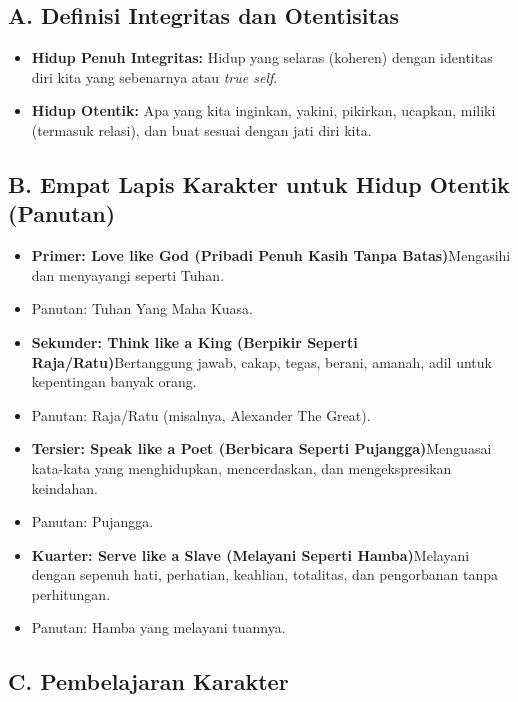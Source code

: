 \documentclass[
  letterpaper,
  DIV=11,
  numbers=noendperiod]{scrreprt}
\providecommand{\tightlist}{%
  \setlength{\itemsep}{0pt}\setlength{\parskip}{0pt}}
\begin{document}
\subsection{A. Definisi Integritas dan
Otentisitas}\label{a.-definisi-integritas-dan-otentisitas}

\begin{itemize}
\tightlist
\item
  \textbf{Hidup Penuh Integritas:} Hidup yang selaras (koheren) dengan
  identitas diri kita yang sebenarnya atau \emph{true self}.
\item
  \textbf{Hidup Otentik:} Apa yang kita inginkan, yakini, pikirkan,
  ucapkan, miliki (termasuk relasi), dan buat sesuai dengan jati diri
  kita.
\end{itemize}

\subsection{B. Empat Lapis Karakter untuk Hidup Otentik
(Panutan)}\label{b.-empat-lapis-karakter-untuk-hidup-otentik-panutan}

\begin{itemize}
\tightlist
\item
  \textbf{Primer: Love like God (Pribadi Penuh Kasih Tanpa
  Batas)}Mengasihi dan menyayangi seperti Tuhan.
\item
  Panutan: Tuhan Yang Maha Kuasa.
\item
  \textbf{Sekunder: Think like a King (Berpikir Seperti
  Raja/Ratu)}Bertanggung jawab, cakap, tegas, berani, amanah, adil untuk
  kepentingan banyak orang.
\item
  Panutan: Raja/Ratu (misalnya, Alexander The Great).
\item
  \textbf{Tersier: Speak like a Poet (Berbicara Seperti
  Pujangga)}Menguasai kata-kata yang menghidupkan, mencerdaskan, dan
  mengekspresikan keindahan.
\item
  Panutan: Pujangga.
\item
  \textbf{Kuarter: Serve like a Slave (Melayani Seperti Hamba)}Melayani
  dengan sepenuh hati, perhatian, keahlian, totalitas, dan pengorbanan
  tanpa perhitungan.
\item
  Panutan: Hamba yang melayani tuannya.
\end{itemize}

\subsection{C. Pembelajaran Karakter}\label{c.-pembelajaran-karakter}
\end{document}
